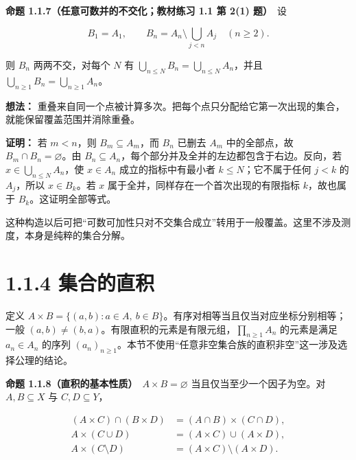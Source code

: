 \documentclass[11pt,a4paper]{article}
\begin{document}
\textbf{命题 1.1.7（任意可数并的不交化；教材练习 1.1 第 2(1) 题）}　设

\begin{equation*}
B_1=A_1,\qquad B_n=A_n\setminus\bigcup_{j<n}A_j\quad(n\ge2).
\tag{1.1.9}
\end{equation*}

则 \(B_n\) 两两不交，对每个 \(N\) 有
\(\bigcup_{n\le N}B_n=\bigcup_{n\le N}A_n\)，并且
\(\bigcup_{n\ge1}B_n=\bigcup_{n\ge1}A_n\)。

\textbf{想法：}
重叠来自同一个点被计算多次。把每个点只分配给它第一次出现的集合，就能保留覆盖范围并消除重叠。

\textbf{证明：} 若 \(m<n\)，则 \(B_m\subseteq A_m\)，而 \(B_n\) 已删去
\(A_m\) 中的全部点，故 \(B_m\cap B_n=\varnothing\)。由
\(B_n\subseteq A_n\)，每个部分并及全并的左边都包含于右边。反向，若
\(x\in\bigcup_{n\le N}A_n\)，使 \(x\in A_n\) 成立的指标中有最小者
\(k\le N\)；它不属于任何 \(j<k\) 的 \(A_j\)，所以 \(x\in B_k\)。若 \(x\)
属于全并，同样存在一个首次出现的有限指标 \(k\)，故也属于
\(B_k\)。这证明全部等式。

这种构造以后可把``可数可加性只对不交集合成立''转用于一般覆盖。这里不涉及测度，本身是纯粹的集合分解。

\section[\S{}1.1.4 集合的直积]{1.1.4 集合的直积}\label{ux96c6ux5408ux7684ux76f4ux79ef}

定义
\(A\times B=\{(a,b):a\in A,\ b\in B\}\)。有序对相等当且仅当对应坐标分别相等；一般
\((a,b)\ne(b,a)\)。有限直积的元素是有限元组，\(\prod_{n\ge1}A_n\)
的元素是满足 \(a_n\in A_n\) 的序列
\((a_n)_{n\ge1}\)。本节不使用``任意非空集合族的直积非空''这一涉及选择公理的结论。

\textbf{命题 1.1.8（直积的基本性质）}　\(A\times B=\varnothing\)
当且仅当至少一个因子为空。对 \(A,B\subseteq X\) 与 \(C,D\subseteq Y\)，

\begin{equation*}
\begin{aligned}
(A\times C)\cap(B\times D)&=(A\cap B)\times(C\cap D),\\
A\times(C\cup D)&=(A\times C)\cup(A\times D),\\
A\times(C\setminus D)&=(A\times C)\setminus(A\times D).
\end{aligned}\tag{1.1.10}
\end{equation*}
\end{document}
